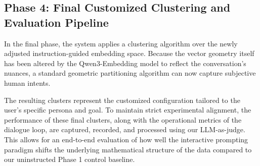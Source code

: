 \subsection{Phase 4: Final Customized Clustering and Evaluation Pipeline}
In the final phase, the system applies a clustering algorithm over the newly adjusted instruction-guided embedding space. 
Because the vector geometry itself has been altered by the Qwen3-Embedding model to reflect the conversation's nuances, a standard geometric partitioning algorithm can now capture subjective human intents. 

The resulting clusters represent the customized configuration tailored to the user's specific persona and goal. 
To maintain strict experimental alignment, the performance of these final clusters, along with the operational metrics of the dialogue loop, are captured, recorded, and processed using our LLM-as-judge. 
This allows for an end-to-end evaluation of how well the interactive prompting paradigm shifts the underlying mathematical structure of the data compared to our uninstructed Phase 1 control baseline.